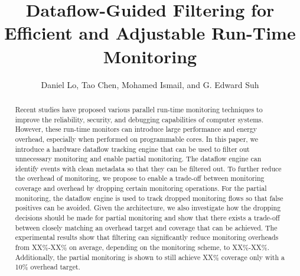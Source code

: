 \title{
Dataflow-Guided Filtering for Efficient and Adjustable Run-Time Monitoring
}

{\author{Daniel Lo, Tao Chen, Mohamed Ismail, and G. Edward Suh}}

\date{}
\maketitle

\thispagestyle{empty}

\begin{abstract}

Recent studies have proposed various parallel run-time monitoring techniques to
improve the reliability, security, and debugging capabilities of computer
systems. However, these run-time monitors can introduce large performance and energy
overhead, especially when performed on programmable cores.
In this paper, we introduce a hardware dataflow tracking engine that can be
used to filter out unnecessary monitoring and enable partial monitoring.
The dataflow engine can identify events with clean metadata so that they can
be filtered out. To further reduce the overhead of monitoring, we propose
to enable a trade-off between monitoring coverage and overhead by dropping certain
monitoring operations. For the partial monitoring, the dataflow engine is used
to track dropped monitoring flows so that false positives can be avoided.
Given the architecture, we also investigate how the dropping decisions should be
made for partial monitoring and show that there exists a trade-off between closely
matching an overhead target and coverage that can be achieved.
The experimental results show that filtering can significantly reduce monitoring
overheads from XX\%-XX\% on average, depending on the monitoring scheme, to
XX\%-XX\%. Additionally, the partial monitoring is shown to still achieve XX\% coverage 
only with a 10\% overhead target.

\end{abstract}
